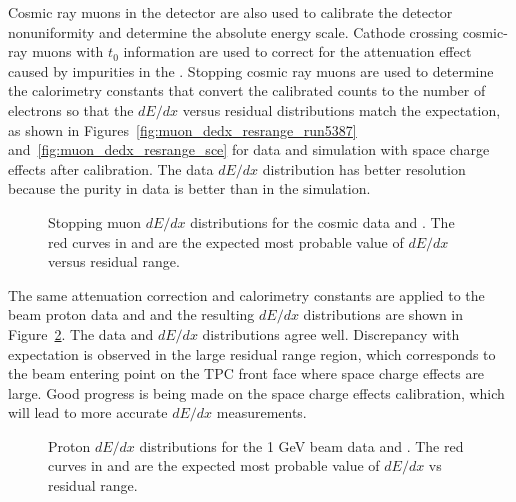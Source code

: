 Cosmic ray muons in the  detector are also used to calibrate the detector nonuniformity and determine the absolute energy scale. Cathode crossing cosmic-ray muons with $t_{0}$ information are used to correct for the attenuation effect caused by impurities in the \lar. Stopping cosmic ray muons are used to determine the calorimetry constants that convert the calibrated  counts to the number of electrons so that the $dE/dx$ versus residual distributions match the expectation, as shown in Figures~\ref{fig:muon_dedx_resrange_run5387} and~\ref{fig:muon_dedx_resrange_sce} for  data and  simulation with space charge effects after calibration. The data $dE/dx$ distribution has better resolution because the purity in data is better than in the simulation. 

\begin{figure}[!ht]
\centering
{}
\caption[Stopping muon $dE/dx$ distributions for the  cosmic data and ]{Stopping muon $dE/dx$ distributions for the  cosmic data and . The red curves in \protect{} and \protect{} are the expected most probable value of $dE/dx$ versus residual range.}
\label{fig:pandora_protodune_mu}
\end{figure}

The same attenuation correction and calorimetry constants are applied to the beam proton data and  and the resulting $dE/dx$ distributions are shown in Figure~\ref{fig:pandora_protodune_proton}. The data and  $dE/dx$ distributions agree well. Discrepancy with expectation is observed in the large residual range region, which corresponds to the beam entering point on the TPC front face where space charge effects are large. Good progress is being made on the space charge effects calibration, which will lead to more accurate $dE/dx$ measurements.
\begin{figure}[!ht]
\centering
{}
\caption[Proton $dE/dx$ distributions for the  1 GeV beam data and ]{Proton $dE/dx$ distributions for the  1 GeV beam data and . The red curves in \protect{} and \protect{} are the expected most probable value of $dE/dx$ vs residual range.}
\label{fig:pandora_protodune_proton}
\end{figure}


